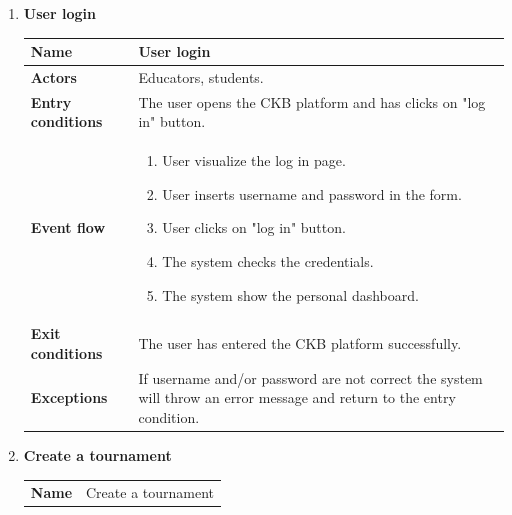 \begin{enumerate}[label=\textbf{UC.\arabic*}]
\begin{table}[H]
        \end{table}
        \item {} \textbf{User login}
        \begin{table}[H]
    	    \centering
                \renewcommand{\arraystretch}{1.5}
                \begin{tabular}{|m{3.2cm}|m{9.8cm}|}
                    \hline
                    \textbf{Name} & User login \\
                    \hline
                    \textbf{Actors} &  Educators, students. \\
                    \hline
                    \textbf{Entry conditions}  & The user opens the CKB platform and has clicks on "log in" button. \\
                    \hline
                    \textbf{Event flow}  & 
                    \begin{enumerate}[label=\arabic*.]
                        \item User visualize the log in page.
                        \item User inserts username and password in the form.
                        \item User clicks on "log in" button.
                        \item The system checks the credentials.
                        \item The system show the personal dashboard.
                    \end{enumerate}\\
                    \hline
                    \textbf{Exit conditions}  & The user has entered the CKB platform successfully. \\
                    \hline
                    \textbf{Exceptions}  & If username and/or password are not correct the system will throw an error message and return to the entry condition. \\
                    \hline 
                \end{tabular}
        \end{table}
        \item {} \textbf{Create a tournament}
        \begin{table}[H]
    	    \centering
                \renewcommand{\arraystretch}{1.5}
                \begin{tabular}{|m{3.2cm}|m{9.8cm}|}
                    \hline
                    \textbf{Name} & Create a tournament \\

\end{tabular}
\end{table}
\end{enumerate}
